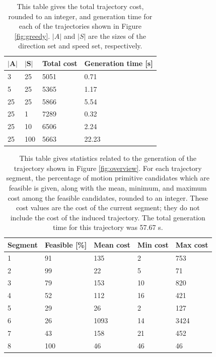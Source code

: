 \documentclass[pageno]{jpaper}
\begin{document}
\begin{table}
  \centering
  \begin{tabular}{|l|l|l|l|} \hline
    $|\textbf{A}|$ & $|\textbf{S}|$ & \textbf{Total cost} & \textbf{Generation time [s]} \\ \hline
    3 & 25 & 5051 & 0.71 \\ \hline
    5 & 25 & 5365 & 1.17 \\ \hline
    25 & 25 & 5866 & 5.54 \\ \hline
    25 & 1 & 7289 & 0.32 \\ \hline
    25 & 10 & 6506 & 2.24 \\ \hline
    25 & 100 & 5663 & 22.23 \\ \hline
  \end{tabular}
  \caption{This table gives the total trajectory cost, rounded to an integer, and generation time for each of the trajectories shown in Figure \ref{fig:greedy}. $|A|$ and $|S|$ are the sizes of the direction set and speed set, respectively.}
  \label{table:total}
\end{table}

\begin{table}
  \centering
  \begin{tabular}{|l|l|l|l|l|} \hline
    \textbf{Segment} & \textbf{Feasible [\%]} & \textbf{Mean cost} & \textbf{Min cost} & \textbf{Max cost} \\ \hline
    1 & 91 & 135 & 2 & 753 \\ \hline
    2 & 99 & 22 & 5 & 71 \\ \hline
    3 & 79 & 153 & 10 & 820 \\ \hline
    4 & 52 & 112 & 16 & 421 \\ \hline
    5 & 29 & 26 & 2 & 127 \\ \hline
    6 & 26 & 1093 & 14 & 3424 \\ \hline
    7 & 43 & 158 & 21 & 452 \\ \hline
    8 & 100 & 46 & 46 & 46 \\ \hline
  \end{tabular}
  \caption{This table gives statistics related to the generation of the trajectory shown in Figure \ref{fig:overview}. For each trajectory segment, the percentage of motion primitive candidates which are feasible is given, along with the mean, minimum, and maximum cost among the feasible candidates, rounded to an integer. These cost values are the cost of the current segment; they do not include the cost of the induced trajectory. The total generation time for this trajectory was 57.67 s.}
  \label{table:segments}
\end{table}
\end{document}
